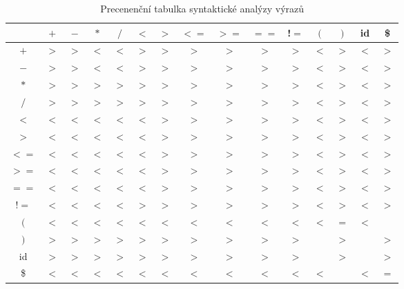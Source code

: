 \documentclass[a4paper, 11pt, titlepage]{article}
\begin{document}
\begin{table}[h]
	\begin{center}
	\footnotesize
	\begin{tabular}{|c| c c c c c c c c c c c c c c|} \hline
			  & $+$ & $-$ & $*$ & $/$ & $<$ & $>$ & $<=$& $>=$& $==$ & !$=$ &  $($   &  $)$   &  id  &    \$ \\ \hline
		$+$   & $>$ & $>$ & $<$ & $<$ & $>$ & $>$ & $>$ & $>$ & $>$  & $>$  & $<$  & $>$  & $<$  & $>$ \\
		$-$   & $>$ & $>$ & $<$ & $<$ & $>$ & $>$ & $>$ & $>$ & $>$  & $>$  & $<$  & $>$  & $<$  & $>$ \\
		$*$   & $>$ & $>$ & $>$ & $>$ & $>$ & $>$ & $>$ & $>$ & $>$  & $>$  & $<$  & $>$  & $<$  & $>$ \\
		$/$   & $>$ & $>$ & $>$ & $>$ & $>$ & $>$ & $>$ & $>$ & $>$  & $>$  & $<$  & $>$  & $<$  & $>$ \\
		$<$   & $<$ & $<$ & $<$ & $<$ & $<$ & $>$ & $>$ & $>$ & $>$  & $>$  & $<$  & $>$  & $<$  & $>$ \\
		$>$   & $<$ & $<$ & $<$ & $<$ & $<$ & $>$ & $>$ & $>$ & $>$  & $>$  & $<$  & $>$  & $<$  & $>$ \\
		$<=$  & $<$ & $<$ & $<$ & $<$ & $<$ & $>$ & $>$ & $>$ & $>$  & $>$  & $<$  & $>$  & $<$  & $>$ \\
		$>=$  & $<$ & $<$ & $<$ & $<$ & $<$ & $>$ & $>$ & $>$ & $>$  & $>$  & $<$  & $>$  & $<$  & $>$ \\
		$==$  & $<$ & $<$ & $<$ & $<$ & $<$ & $>$ & $>$ & $>$ & $>$  & $>$  & $<$  & $>$  & $<$  & $>$ \\
		!$=$  & $<$ & $<$ & $<$ & $<$ & $>$ & $>$ & $>$ & $>$ & $>$  & $>$  & $<$  & $>$  & $<$  & $>$ \\
		$($   & $<$ & $<$ & $<$ & $<$ & $<$ & $<$ & $<$ & $<$ & $<$  & $<$  & $<$  & $=$  & $<$  &     \\
		$)$   & $>$ & $>$ & $>$ & $>$ & $>$ & $>$ & $>$ & $>$ & $>$  & $>$  &      & $>$  &      & $>$ \\
		id    & $>$ & $>$ & $>$ & $>$ & $>$ & $>$ & $>$ & $>$ & $>$  & $>$  &      & $>$  &      & $>$ \\
		\$    & $<$ & $<$ & $<$ & $<$ & $<$ & $<$ & $<$ & $<$ & $<$  & $<$  & $<$  &      & $<$  & $=$ \\ \hline
	\end{tabular}
	\caption{Precenenční tabulka syntaktické analýzy výrazů}
	\label{table_2:PA}
	\end{center}
\end{table}
\end{document}

